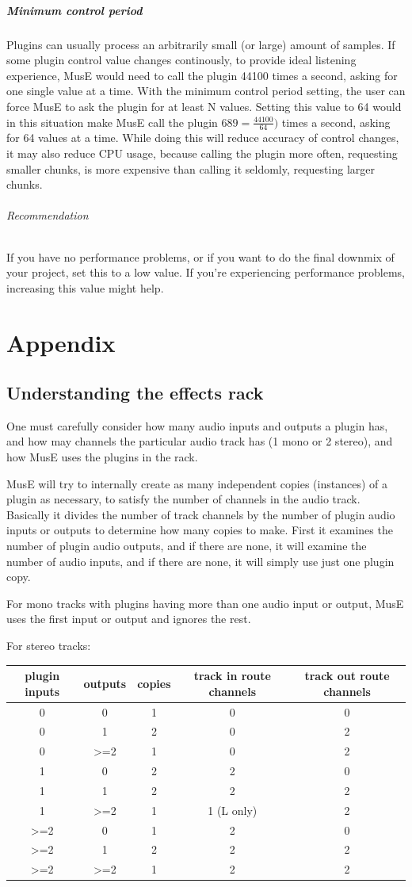 \documentclass[a4paper]{report}
\providecommand{\tabularnewline}{\\}
\begin{document}
\paragraph{Minimum control period}
Plugins can usually process an arbitrarily small (or large) amount
of samples. If some plugin control value changes continously, to provide
ideal listening experience, MusE would need to call the plugin 44100
times a second, asking for one single value at a time. With the minimum
control period setting, the user can force MusE to ask the plugin for
at least N values. Setting this value to 64 would in this situation
make MusE call the plugin $689=\frac{44100}{64})$ times a second,
asking for 64 values at a time. While doing this will reduce accuracy
of control changes, it may also reduce CPU usage, because calling
the plugin more often, requesting smaller chunks, is more expensive
than calling it seldomly, requesting larger chunks.
\subparagraph{Recommendation}
If you have no performance problems, or if you want to do the final
downmix of your project, set this to a low value. If you're experiencing
performance problems, increasing this value might help.

\chapter{Appendix}
\label{apx_effects_rack} \section{Understanding the effects rack} 
One must carefully consider how many audio inputs and outputs a plugin
has, and how may channels the particular audio track has (1 mono or
2 stereo), and how MusE uses the plugins in the rack.

MusE will try to internally create as many independent copies
(instances) of a plugin as necessary, to satisfy the number of channels
in the audio track.
Basically it divides the number of track channels by the number of 
plugin audio inputs or outputs to determine how many copies to make.
First it examines the number of plugin audio outputs, and if there are
none, it will examine the number of audio inputs, and if there are
none, it will simply use just one plugin copy.

For mono tracks with plugins having more than one audio input or
output, MusE uses the first input or output and ignores the rest. 

For stereo tracks:

\begin{tabular}{|c|c|c|c|c|}
\hline 
plugin inputs & outputs & copies & track in route channels &
track out route channels\tabularnewline
\hline 
\hline 
0 & 0 & 1 & 0 & 0\tabularnewline
\hline 
0 & 1 & 2 & 0 & 2\tabularnewline
\hline 
0 & >=2 & 1 & 0 & 2\tabularnewline
\hline 
1 & 0 & 2 & 2 & 0\tabularnewline
\hline 
1 & 1 & 2 & 2 & 2\tabularnewline
\hline 
1 & >=2 & 1 & 1 (L only) & 2\tabularnewline
\hline 
>=2 & 0 & 1 & 2 & 0\tabularnewline
\hline 
>=2 & 1 & 2 & 2 & 2\tabularnewline
\hline 
>=2 & >=2 & 1 & 2 & 2\tabularnewline
\hline 
\end{tabular}
\end{document}
